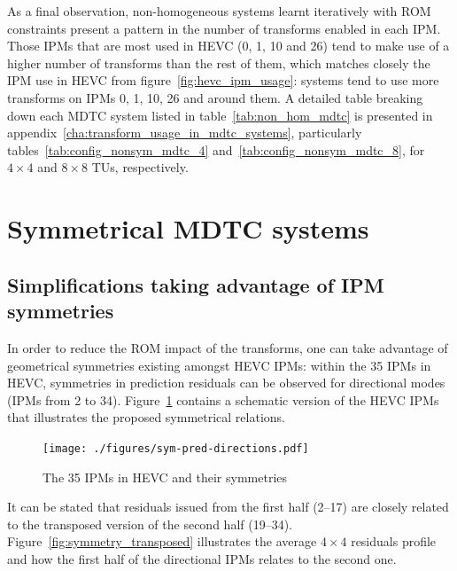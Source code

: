 \documentclass[11pt,a4paper,openright,twoside]{book}
\def\usepdfs{1} %
\numberwithin{equation}{section} %
\numberwithin{figure}{section} %
\numberwithin{table}{section} %
\begin{document}
As a final observation, non-homogeneous systems learnt iteratively with
\acs{ROM} constraints present a pattern in the number of transforms enabled in
each \ac{IPM}.
Those \acp{IPM} that are most used in \ac{HEVC} (0, 1, 10 and 26) tend to make
use of a higher number of transforms than the rest of them, which matches
closely the \ac{IPM} use in \ac{HEVC} from figure~\ref{fig:hevc_ipm_usage}:
systems tend to use more transforms on \acsp{IPM} 0, 1, 10, 26 and around
them.
A detailed table breaking down each \ac{MDTC} system listed in
table~\ref{tab:non_hom_mdtc} is presented in
appendix~\ref{cha:transform_usage_in_mdtc_systems}, particularly
tables~\ref{tab:config_nonsym_mdtc_4} and~\ref{tab:config_nonsym_mdtc_8}, for
$4\times4$ and $8\times8$ \acp{TU}, respectively.

\section{Symmetrical \acs{MDTC} systems}
\label{sec:sym_mdtc}

\subsection{Simplifications taking advantage of \acs{IPM} symmetries}
\label{sub:simplifications_taking_advantage_of_ipm_symmetries}

In order to reduce the \acs{ROM} impact of the transforms, one can take
advantage of geometrical symmetries existing amongst \ac{HEVC} \acp{IPM}:
within the 35 \acp{IPM} in \ac{HEVC}, symmetries in prediction residuals can
be observed for directional modes (\acp{IPM} from 2 to 34).
Figure~\ref{fig:sym_pred_directions} contains a schematic version of the
\ac{HEVC} \acp{IPM} that illustrates the proposed symmetrical relations.

\begin{figure}[t]
	\centering
	\ifthenelse{\usepdfs = 0}
	{}
	{\texttt{[image: ./figures/sym-pred-directions.pdf]}}
	\caption{The 35 \acsp{IPM} in \acs{HEVC} and their symmetries}
	\label{fig:sym_pred_directions}
\end{figure}

It can be stated that residuals issued from the first half (2--17) are closely
related to the transposed version of the second half (19--34).
Figure~\ref{fig:symmetry_transposed} illustrates the average $4\times4$
residuals profile and how the first half of the directional \acp{IPM} relates
to the second one.
\end{document}
